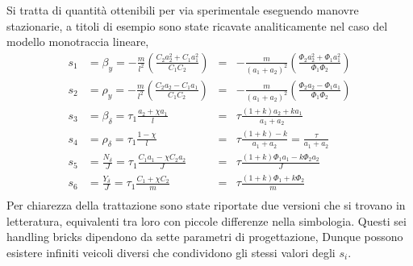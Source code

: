Si tratta di quantità ottenibili per via sperimentale eseguendo manovre stazionarie, a titoli di esempio sono state 
ricavate analiticamente nel caso del modello monotraccia lineare,
  \begin{align*}
     s_1 & =\beta_y = - \frac{m}{l^2} (\frac{C_2a_2^2+C_1a_1^2}{C_1C_2}) & = & - \frac{m}{(a_1+a_2)^2} (\frac{\Phi_2a_2^2+\Phi_1a_1^2}{\Phi_1\Phi_2})\\
     s_2 & =\rho_y = - \frac{m}{l^2} (\frac{C_2a_2-C_1a_1}{C_1C_2}) & = & - \frac{m}{(a_1+a_2)^2} (\frac{\Phi_2a_2-\Phi_1a_1}{\Phi_1\Phi_2})\\
     s_3 & =\beta_{\delta}= \tau_1 \frac{a_2+\chi a_1}{l} & = & \tau \frac{(1+k)a_2+k a_1}{a_1+a_2}\\
     s_4 & =\rho_{\delta}= \tau_1 \frac{1-\chi}{l} & = & \tau \frac{(1+k)-k}{a_1+a_2} = \frac{\tau}{a_1+a_2}\\
     s_5 & =\frac{N_{\delta}}{J}= \tau_1 \frac{C_1a_1-\chi C_2a_2}{J} & = & \tau \frac{(1+k)\Phi_1a_1-k \Phi_2a_2}{J}\\
     s_6 & =\frac{Y_{\delta}}{J}= \tau_1 \frac{C_1 + \chi C_2}{m} & = & \tau \frac{(1+k)\Phi_1 + k \Phi_2}{m}\\
  \end{align*}
Per chiarezza della trattazione sono state riportate due versioni che si trovano in letteratura, equivalenti tra loro con
piccole differenze nella simbologia.
Questi sei handling bricks dipendono da sette parametri di progettazione, 
Dunque possono esistere infiniti veicoli diversi che condividono gli stessi valori degli $s_i$.

